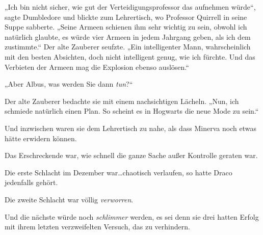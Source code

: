 „Ich bin nicht sicher, wie gut der Verteidigungsprofessor das aufnehmen würde“, sagte Dumbledore und blickte zum Lehrertisch, wo Professor Quirrell in seine Suppe sabberte. „Seine Armeen schienen ihm sehr wichtig zu sein, obwohl ich natürlich glaubte, es würde vier Armeen in jedem Jahrgang geben, als ich dem zustimmte.“ Der alte Zauberer seufzte. „Ein intelligenter Mann, wahrscheinlich mit den besten Absichten, doch nicht intelligent genug, wie ich fürchte. Und das Verbieten der Armeen mag die Explosion ebenso auslösen.“

„Aber Albus, was werden Sie dann \emph{tun}?“

Der alte Zauberer bedachte sie mit einem nachsichtigen Lächeln. „Nun, ich schmiede natürlich einen Plan. So scheint es in Hogwarts die neue Mode zu sein.“

Und inzwischen waren sie dem Lehrertisch zu nahe, als dass Minerva noch etwas hätte erwidern können.

\later

Das Erschreckende war, wie schnell die ganze Sache außer Kontrolle geraten war.

Die erste Schlacht im Dezember war…chaotisch verlaufen, so hatte Draco jedenfalls gehört.

Die zweite Schlacht war völlig \emph{verworren}.

Und die nächste würde noch \emph{schlimmer} werden, es sei denn sie drei hatten Erfolg mit ihrem letzten verzweifelten Versuch, das zu verhindern.

